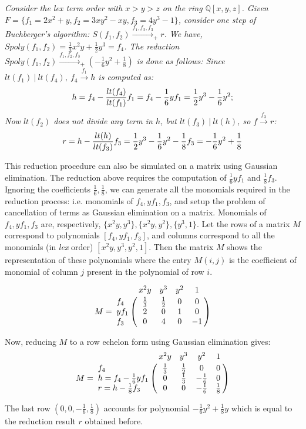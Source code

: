 \begin{Example}
{\it
Consider the {\it lex} term order with $x>y>z$ on the ring
${\mathbb{Q}}[x, y, z]$.  Given $F = \{f_1 = 2x^2 + y, f_2 = 3xy^2
-xy, f_3 = 4y^3 -1\}$, consider one step of Buchberger's algorithm:
$S(f_1, f_2) \xrightarrow{f_1, f_2, f_3}_+r$. We have, $Spoly(f_1,
f_2) = \frac{1}{3}x^2y + \frac{1}{2}y^3 = f_4$. The reduction
$Spoly(f_1, f_2)\stackrel{f_1, f_2, f_3}{\longrightarrow}_+
(-\frac{1}{6}y^2 + \frac{1}{8})$ is done as follows: 
Since $lt(f_1) ~|~ lt(f_4), ~f_4 \xrightarrow{f_1} h$ is computed as:
\[
h = f_4 - {{lt(f_4)} \over {lt(f_1)}} f_1 = f_4 - \frac{1}{6}y f_1 =
\frac{1}{2}y^3 - \frac{1}{6}y^2; 
\]
Now $lt(f_2)$ does not divide any term in $h$, but $lt(f_3) ~|~ lt(h)$,
so $f \xrightarrow{f_3} r$:
\[
r = h - {{lt(h)} \over {lt(f_3)}} f_3 =  \frac{1}{2}y^3 - \frac{1}{6}y^2 -
\frac{1}{8}f_3 = -\frac{1}{6}y^2 + \frac{1}{8} 
\]

This reduction procedure can also be simulated on a matrix using
Gaussian elimination. 
The reduction above requires the computation of $\frac{1}{6}y f_1$ and 
$\frac{1}{8}f_3$. Ignoring the coefficients $\frac{1}{6},
\frac{1}{8}$, 
we can generate all the monomials  required in the reduction process: 
i.e.  monomials of $f_4, yf_1, f_3$, and setup the problem of
cancellation of terms as Gaussian elimination on a matrix. Monomials
of $f_4, yf_1, f_3$ are, respectively, $\{x^2y, y^3\}, \{x^2y, y^2\}, \{y^3, 1\}$.
Let the rows of a matrix $M$ correspond to polynomials $\left[ f_4,
  yf_1, f_3   \right]$, and columns correspond to all the monomials
(in {\it lex} order) $\left[x^2y, y^3, y^2,  1 \right]$. Then the
matrix $M$ shows the representation of these polynomials where
the entry $M(i, j)$ is the coefficient of monomial of column $j$
present in the polynomial of row $i$.

\[
M = \bordermatrix{
~ & x^2y & y^3 & y^2 & 1\cr
f_4 & \frac{1}{3} & \frac{1}{2} & 0 & 0 \cr
yf_1 & 2 &0 & 1 & 0 \cr
f_3 & 0 & 4 & 0 & -1 \cr
}
\]

Now, reducing $M$ to a row echelon form using Gaussian elimination gives:
\[
M = \bordermatrix{
~ & x^2y & y^3 & y^2 & 1\cr
f_4 & \frac{1}{3} & \frac{1}{2} & 0 & 0 \cr 
h = f_4 - \frac{1}{6}yf_1 & 0 &\frac{1}{3}  & -\frac{1}{6} & 0 \cr 
r = h - \frac{1}{8}f_3 & 0 & 0 & -\frac{1}{6} & \frac{1}{8} \cr 
}
\]

The last row $(0, 0, -\frac{1}{6}, \frac{1}{8})$ accounts for
polynomial $-\frac{1}{6}y^2 + \frac{1}{8}y$ which is equal to the
reduction result $r$ obtained before. 
}
\end{Example}

